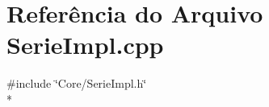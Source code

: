 \section{Referência do Arquivo Serie\+Impl.\+cpp}
\label{_serie_impl_8cpp}
{\ttfamily \#include \char`\"{}Core/\+Serie\+Impl.\+h\char`\"{}}\\*
